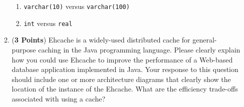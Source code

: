 \documentclass[12pt]{article}
\begin{document}
\begin{enumerate}
\begin{enumerate}
      \begin{enumerate}

      \item {\tt varchar(10)} versus {\tt varchar(100)}

      \item {\tt int} versus {\tt real}

      \end{enumerate}

    \item ({\bf 3 Points}) Ehcache is a widely-used distributed cache for general-purpose caching in the Java
      programming language.  Please clearly explain how you could use Ehcache to improve the performance of a Web-based
      database application implemented in Java.  Your response to this question should include one or more architecture
      diagrams that clearly show the location of the instance of the Ehcache. What are the efficiency trade-offs
      associated with using a cache?

    \end{enumerate}

\newpage





    


\end{enumerate}
\end{document}
